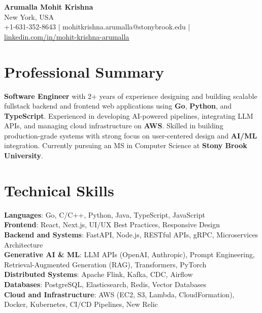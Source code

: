 \documentclass[letterpaper,11pt]{article}
\begin{document}
\begin{center}
  {\Large \textbf{Arumalla Mohit Krishna}} \\
  New York, USA \\
  +1-631-352-8643 \enspace | \enspace mohitkrishna.arumalla@stonybrook.edu \enspace | \enspace \href{https://www.linkedin.com/in/mohit-krishna-arumalla}{linkedin.com/in/mohit-krishna-arumalla}
\end{center}

\section{Professional Summary}
  \begin{itemize}[leftmargin=0.15in, label={}]
    \small{\item{
     \textbf{Software Engineer} with 2+ years of experience designing and building scalable fullstack backend and frontend web applications using \textbf{Go}, \textbf{Python}, and \textbf{TypeScript}. Experienced in developing AI-powered pipelines, integrating LLM APIs, and managing cloud infrastructure on \textbf{AWS}. Skilled in building production-grade systems with strong focus on user-centered design and \textbf{AI/ML} integration. Currently pursuing an MS in Computer Science at \textbf{Stony Brook University}.
    }}
  \end{itemize}
\vspace{-16pt}

\section{Technical Skills}
 \begin{itemize}[leftmargin=0.15in, label={}]
    \small{\item{
     \textbf{Languages}: Go, C/C++, Python, Java, TypeScript, JavaScript \\
     \textbf{Frontend}: React, Next.js, UI/UX Best Practices, Responsive Design \\
     \textbf{Backend and Systems}: FastAPI, Node.js, RESTful APIs, gRPC, Microservices Architecture \\
     \textbf{Generative AI \& ML}: LLM APIs (OpenAI, Anthropic), Prompt Engineering, Retrieval-Augmented Generation (RAG), Transformers, PyTorch \\
     \textbf{Distributed Systems}: Apache Flink, Kafka, CDC, Airflow \\
     \textbf{Databases}: PostgreSQL, Elasticsearch, Redis, Vector Databases \\
     \textbf{Cloud and Infrastructure}: AWS (EC2, S3, Lambda, CloudFormation), Docker, Kubernetes, CI/CD Pipelines, New Relic \\
    }}
 \end{itemize}
\vspace{-16pt}
\end{document}
